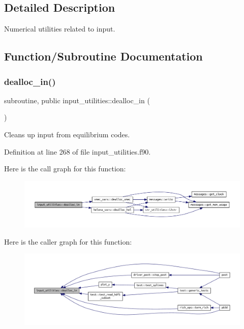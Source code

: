 \subsection{Detailed Description}
Numerical utilities related to input. 

\subsection{Function/\+Subroutine Documentation}
\mbox{\label{namespaceinput__utilities_aa0cf7578f9c9ab6470f8bb8d025f1daf}} 
\subsubsection{\texorpdfstring{dealloc\+\_\+in()}{dealloc\_in()}}
{\footnotesize\ttfamily subroutine, public input\+\_\+utilities\+::dealloc\+\_\+in (\begin{DoxyParamCaption}{ }\end{DoxyParamCaption})}



Cleans up input from equilibrium codes. 



Definition at line 268 of file input\+\_\+utilities.\+f90.

Here is the call graph for this function\+:\nopagebreak
\begin{figure}[H]
\begin{center}
\leavevmode
\includegraphics[width=350pt]{namespaceinput__utilities_aa0cf7578f9c9ab6470f8bb8d025f1daf_cgraph}
\end{center}
\end{figure}
Here is the caller graph for this function\+:\nopagebreak
\begin{figure}[H]
\begin{center}
\leavevmode
\includegraphics[width=350pt]{namespaceinput__utilities_aa0cf7578f9c9ab6470f8bb8d025f1daf_icgraph}
\end{center}
\end{figure}
\mbox{\label{namespaceinput__utilities_a03e09af96ba6f7e187ea4a1d9b743148}} 
